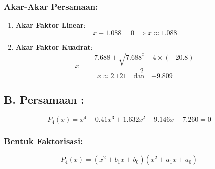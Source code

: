 \documentclass{article}
\begin{document}
\subsubsection*{Akar-Akar Persamaan:}
\begin{enumerate}
    \item \textbf{Akar Faktor Linear}:
    \begin{equation}
        x - 1.088 = 0 \implies x \approx \boxed{1.088}
    \end{equation}
    
    \item \textbf{Akar Faktor Kuadrat}:
    \begin{equation}
        x = \frac{-7.688 \pm \sqrt{7.688^2 - 4 \times (-20.8)}}{2}
    \end{equation}
    \begin{equation}
        x \approx \boxed{2.121} \quad \text{dan} \quad \boxed{-9.809}
    \end{equation}
\end{enumerate}

\subsection*{B. Persamaan :}
\begin{equation}
    P_4(x) = x^4 - 0.41x^3 + 1.632x^2 - 9.146x + 7.260 = 0
\end{equation}

\subsubsection*{Bentuk Faktorisasi:}
\begin{equation}
    P_4(x) = (x^2 + b_1x + b_0)(x^2 + a_1x + a_0)
\end{equation}
\end{document}
